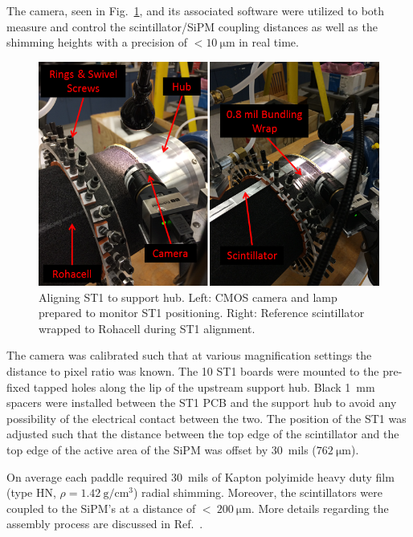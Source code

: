 The camera, seen in Fig.~\ref{fig:aligning_st1_to_hub}, and its associated software were utilized to both measure and control the scintillator/SiPM coupling distances as well as the shimming heights with a precision of $\mathrm{< 10\ \mu m}$ in real time. 
	\begin{figure}[!htb]
		\centering
		\includegraphics[width=1.0\columnwidth]{fabrication/figs/aligning_st1_to_hub}
		\caption{Aligning ST1 to support hub.  Left: CMOS camera and lamp prepared to monitor ST1 positioning.  Right: Reference scintillator wrapped to Rohacell during ST1 alignment.}
		\label{fig:aligning_st1_to_hub}
	\end{figure}
The camera was calibrated such that at various magnification settings the distance to pixel ratio was known.  The 10 ST1 boards were mounted to the pre-fixed tapped holes along the lip of the upstream support hub.  Black 1~mm spacers were installed between the ST1 PCB and the support hub to avoid any possibility of the electrical contact between the two.  The position of the ST1 was adjusted such that the distance between the top edge of the scintillator and the top edge of the active area of the SiPM was offset by 30~mils ($\mathrm{762\ \mu m}$).  %



On average each paddle required 30~mils of Kapton polyimide heavy duty film (type HN, $\rho = 1.42\ \mathrm{g/cm^{3}}$) radial shimming.  Moreover, the scintillators were coupled to the SiPM's at a distance of $\mathrm{<\ 200\ \mu m}$.  More details regarding the assembly process are discussed in Ref.~\cite{pooser16}.

